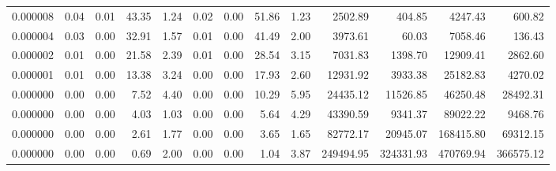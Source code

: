 \begin{tabular}{lrrrrrrrrrrrr}
0.000008 & 0.04 & 0.01 & 43.35 & 1.24 & 0.02 & 0.00 & 51.86 & 1.23 & 2502.89 & 404.85 & 4247.43 & 600.82 \\
0.000004 & 0.03 & 0.00 & 32.91 & 1.57 & 0.01 & 0.00 & 41.49 & 2.00 & 3973.61 & 60.03 & 7058.46 & 136.43 \\
0.000002 & 0.01 & 0.00 & 21.58 & 2.39 & 0.01 & 0.00 & 28.54 & 3.15 & 7031.83 & 1398.70 & 12909.41 & 2862.60 \\
0.000001 & 0.01 & 0.00 & 13.38 & 3.24 & 0.00 & 0.00 & 17.93 & 2.60 & 12931.92 & 3933.38 & 25182.83 & 4270.02 \\
0.000000 & 0.00 & 0.00 & 7.52 & 4.40 & 0.00 & 0.00 & 10.29 & 5.95 & 24435.12 & 11526.85 & 46250.48 & 28492.31 \\
0.000000 & 0.00 & 0.00 & 4.03 & 1.03 & 0.00 & 0.00 & 5.64 & 4.29 & 43390.59 & 9341.37 & 89022.22 & 9468.76 \\
0.000000 & 0.00 & 0.00 & 2.61 & 1.77 & 0.00 & 0.00 & 3.65 & 1.65 & 82772.17 & 20945.07 & 168415.80 & 69312.15 \\
0.000000 & 0.00 & 0.00 & 0.69 & 2.00 & 0.00 & 0.00 & 1.04 & 3.87 & 249494.95 & 324331.93 & 470769.94 & 366575.12 \\
\bottomrule
\end{tabular}
